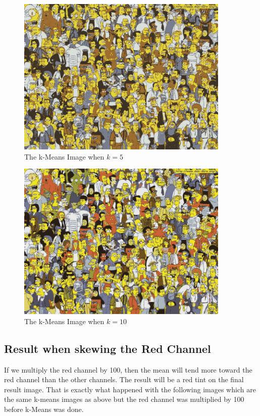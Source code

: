 \documentclass[11pt,psfig]{article}
\begin{document}
\begin{figure}[H]
\centering
\includegraphics[height=3in]{5-means_simpsons.jpg}
\caption{The k-Means Image when $k=5$}
\end{figure}

\begin{figure}[H]
\centering
\includegraphics[height=3in]{10-means_simpsons.jpg}
\caption{The k-Means Image when $k=10$}
\end{figure}

\subsection*{Result when skewing the Red Channel}

If we multiply the red channel by 100, then the mean will tend more toward the red channel than the other channels. The result will be a red tint on the final result image. That is exactly what happened with the following images which are the same k-means images as above but the red channel was multiplied by 100 before k-Means was done. 
\end{document}
